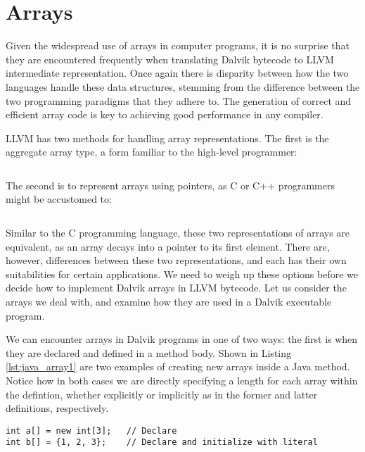 \section{Arrays}
\label{sec:arrays}

Given the widespread use of arrays in computer programs, it is no surprise that they are encountered frequently when translating Dalvik bytecode to LLVM intermediate representation. Once again there is disparity between how the two languages handle these data structures, stemming from the difference between the two programming paradigms that they adhere to. The generation of correct and efficient array code is key to achieving good performance in any compiler.

LLVM has two methods for handling array representations. The first is the aggregate array type, a form familiar to the high-level programmer:

\lstset{
	language=Assembly,
	basicstyle=\small,
	stringstyle=\ttfamily
}
\begin{lstlisting}[frame=single]
%array = [<# elements> x <element type>]
\end{lstlisting}

The second is to represent arrays using pointers, as C or C++ programmers might be accustomed to:

\begin{lstlisting}[frame=single]
%array = <element type>*
\end{lstlisting}

Similar to the C programming language, these two representations of arrays are equivalent, as an array decays into a pointer to its first element. There are, however, differences between these two representations, and each has their own suitabilities for certain applications. We need to weigh up these options before we decide how to implement Dalvik arrays in LLVM bytecode. Let us consider the arrays we deal with, and examine how they are used in a Dalvik executable program.

We can encounter arrays in Dalvik programs in one of two ways: the first is when they are declared and defined in a method body. Shown in Listing \ref{lst:java_array1} are two examples of creating new arrays inside a Java method. Notice how in both cases we are directly specifying a length for each array within the defintion, whether explicitly or implicitly as in the former and latter definitions, respectively.

\lstset{
	language=Java,
	basicstyle=\small,
	stringstyle=\ttfamily
}
\begin{lstlisting}[frame=single, caption={Arrays in Java}, label={lst:java_array1}]
int a[] = new int[3];   // Declare
int b[] = {1, 2, 3};    // Declare and initialize with literal
\end{lstlisting}

